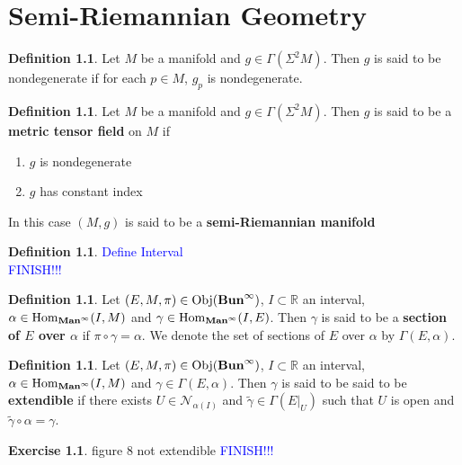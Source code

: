 \documentclass{book}
\theoremstyle{definition}
\newtheorem{defn}[definition]{Definition}
\newtheorem{ex}[definition]{Exercise}
\newcommand{\al}{\alpha}
\newcommand{\gam}{\gamma}
\newcommand{\Gam}{\Gamma}
\newcommand{\Sig}{\Sigma}
\newcommand{\R}{\mathbb{R}}
\newcommand{\MN}{\mathcal{N}}
\DeclareMathOperator{\Obj}{Obj}
\DeclareMathOperator{\Hom}{Hom}
\DeclareMathOperator*{\Maninf}{\text{\tbf{Man}}^{\infty}}
\DeclareMathOperator*{\Buninf}{\text{\tbf{Bun}}^{\infty}}
\DeclareMathOperator*{\0}{\mbf{0}}
\DeclareMathOperator*{\1}{\mbf{1}}
\newcommand{\tbf}[1]{\textbf{#1}}
\newcommand{\tcb}[1]{\textcolor{blue}{#1}}
\begin{document}
	\newpage
	\chapter{Semi-Riemannian Geometry}
	
	\begin{defn}
		Let $M$ be a manifold and $g \in \Gamma(\Sig^2 M)$. Then $g$ is said to be nondegenerate if for each $p \in M$, $g_p$ is nondegenerate.
		\end{defn}
	
	\begin{defn}
		Let $M$ be a manifold and $g \in \Gam(\Sig^2 M)$. Then $g$ is said to be a \tbf{metric tensor field} on $M$ if 
		\begin{enumerate}
			\item $g$ is nondegenerate
			\item $g$ has constant index
		\end{enumerate}
		In this case $(M, g)$ is said to be a \tbf{semi-Riemannian manifold}
	\end{defn}

	\begin{defn}
		\tcb{Define Interval\\
		FINISH!!!}
	\end{defn}

	\begin{defn}
		Let $(E, M, \pi) \in \Obj(\Buninf)$, $I \subset \R$ an interval, $\al \in \Hom_{\Maninf}(I, M)$ and $\gam \in \Hom_{\Maninf}(I, E)$. Then $\gam$ is said to be a \tbf{section of $E$ over $\al$} if $\pi \circ \gam = \al$. We denote the set of sections of $E$ over $\al$ by $\Gam(E, \al)$. 
	\end{defn}

	\begin{defn}
		Let $(E, M, \pi) \in \Obj(\Buninf)$, $I \subset \R$ an interval, $\al \in \Hom_{\Maninf}(I, M)$ and $\gam \in \Gam(E, \al)$. Then $\gam$ is said to be said to be \tbf{extendible} if there exists $U \in \MN_{\al(I)}$ and $\tilde{\gam} \in \Gam(E|_U)$ such that $U$ is open and $\tilde{\gam} \circ \al = \gam $.
	\end{defn}

	\begin{ex}
		figure 8 not extendible
		\tcb{FINISH!!!}
	\end{ex}
\end{document}

